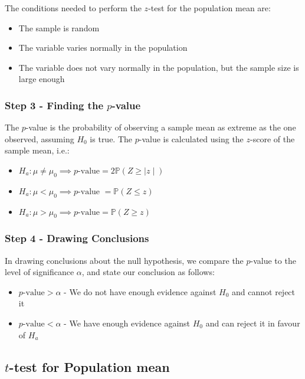 \documentclass[12pt letter]{report}
\begin{document}
The conditions needed to perform the $z$-test for the population mean are:
\begin{itemize}
  \item The sample is random
  \item The variable varies normally in the population
  \item The variable does not vary normally in the population, but the sample size is large enough
\end{itemize}

\subsubsection{Step 3 - Finding the $p$-value}

The $p$-value is the probability of observing a sample mean as extreme as the one observed, assuming $H_0$ is true.
The $p$-value is calculated using the $z$-score of the sample mean, i.e.:
\begin{itemize}
  \item $H_a: \mu \neq \mu_0 \implies p\text{-value} = 2 \mathbb{P}\left( Z \geq  \mid z \mid  \right) $
  \item $H_a: \mu < \mu_0 \implies  p\text{-value } = \mathbb{P}\left( Z \leq z \right) $
  \item $H_a: \mu > \mu_0 \implies p\text{-value} = \mathbb{P}\left( Z \geq z \right) $
\end{itemize}

\subsubsection{Step 4 - Drawing Conclusions}

In drawing conclusions about the null hypothesis, we compare the $p$-value to the level of significance $\alpha $, and
state our conclusion as follows:
\begin{itemize}
  \item $p\text{-value} > \alpha$ - We do not have enough evidence against $H_0$ and cannot reject it
  \item $p\text{-value} < \alpha$ - We have enough evidence against $H_0$ and can reject it in favour of $H_a$
\end{itemize}

\subsection{$t$-test for Population mean}
\end{document}
